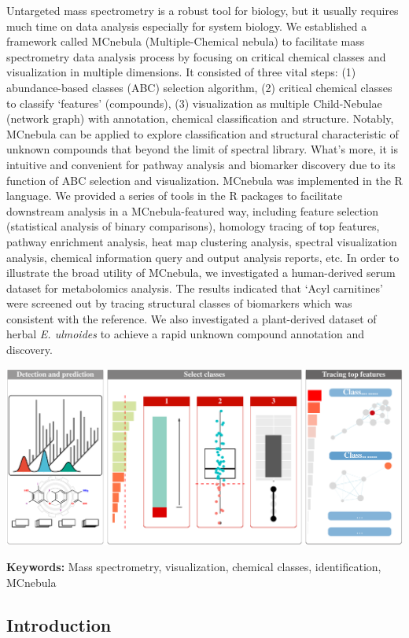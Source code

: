 \documentclass[
]{article}
\begin{document}
Untargeted mass spectrometry is a robust tool for biology, but it
usually requires much time on data analysis especially for system
biology. We established a framework called MCnebula (Multiple-Chemical
nebula) to facilitate mass spectrometry data analysis process by
focusing on critical chemical classes and visualization in multiple
dimensions. It consisted of three vital steps: (1) abundance-based
classes (ABC) selection algorithm, (2) critical chemical classes to
classify `features' (compounds), (3) visualization as multiple
Child-Nebulae (network graph) with annotation, chemical classification
and structure. Notably, MCnebula can be applied to explore
classification and structural characteristic of unknown compounds that
beyond the limit of spectral library. What's more, it is intuitive and
convenient for pathway analysis and biomarker discovery due to its
function of ABC selection and visualization. MCnebula was implemented in
the R language. We provided a series of tools in the R packages to
facilitate downstream analysis in a MCnebula-featured way, including
feature selection (statistical analysis of binary comparisons), homology
tracing of top features, pathway enrichment analysis, heat map
clustering analysis, spectral visualization analysis, chemical
information query and output analysis reports, etc. In order to
illustrate the broad utility of MCnebula, we investigated a
human-derived serum dataset for metabolomics analysis. The results
indicated that `Acyl carnitines' were screened out by tracing structural
classes of biomarkers which was consistent with the reference. We also
investigated a plant-derived dataset of herbal \emph{E. ulmoides} to
achieve a rapid unknown compound annotation and discovery.

\includegraphics{tocg.pdf}

\textbf{Keywords:} Mass spectrometry, visualization, chemical classes,
identification, MCnebula

\hypertarget{introduction}{%
\subsection{Introduction}\label{introduction}}
\end{document}
